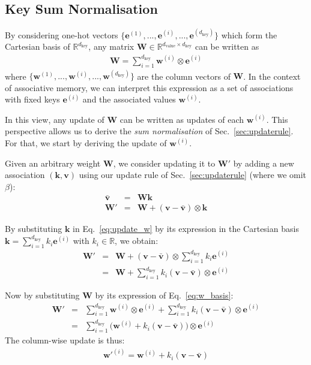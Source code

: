 \documentclass{article}
\def\ve{{\bm{e}}}
\def\vk{{\bm{k}}}
\def\vv{{\bm{v}}}
\def\vw{{\bm{w}}}
\def\mW{{\bm{W}}}
\theoremstyle{definition}
\begin{document}
\subsection{Key Sum Normalisation}
\label{app:norm}

By considering one-hot vectors $\{\ve^{(1)}, ..., \ve^{(i)}, ..., \ve^{(d_\text{key})}\}$
which form the Cartesian basis of $\mathbb{R}^{d_\text{key}}$,
any matrix $\mW \in \mathbb{R}^{d_\text{value} \times d_\text{key}}$ can be written as
\begin{eqnarray}
\mW = \displaystyle \sum_{i=1}^{d_\text{key}} \vw^{(i)}\otimes \ve^{(i)} \label{eq:w_basis}
\end{eqnarray}
where $\{\vw^{(1)}, ..., \vw^{(i)}, ..., \vw^{(d_\text{key})}\}$ are the column vectors of $\mW$.
In the context of associative memory, we can interpret this expression as a set of associations with fixed keys $\ve^{(i)}$ and the associated values $\vw^{(i)}$.

In this view, any update of $\mW$ can be written as updates of each $\vw^{(i)}$.
This perspective allows us to derive the \textit{sum normalisation} of Sec.~\ref{sec:updaterule}.
For that, we start by deriving the update of $\vw^{(i)}$. 

Given an arbitrary weight $\mW$, we consider updating it to $\mW'$ by adding a
new association $(\vk, \vv)$ using our update rule of Sec.~\ref{sec:updaterule} (where we omit
$\beta$):
\begin{eqnarray}
\bar{\vv} &=& \mW \vk \\
\mW' &=& \mW + (\vv - \bar{\vv}) \otimes \vk \label{eq:update_w}
\end{eqnarray}

By substituting $\vk$ in Eq.~\ref{eq:update_w} by its expression in the Cartesian basis $\displaystyle \vk = \sum_{i=1}^{d_\text{key}} k_i \ve^{(i)}$ with $k_i \in \mathbb{R}$, we obtain:
\begin{eqnarray}
\mW' &=& \mW + (\vv - \bar{\vv})  \otimes \sum_{i=1}^{d_\text{key}} k_i \ve^{(i)} \\
&=& \mW + \sum_{i=1}^{d_\text{key}} k_i (\vv - \bar{\vv})  \otimes \ve^{(i)} 
\end{eqnarray}

Now by substituting $\mW$ by its expression of Eq.~\ref{eq:w_basis}:
\begin{eqnarray}
\mW' &=& \sum_{i=1}^{d_\text{key}} \vw^{(i)}\otimes \ve^{(i)}  + \sum_{i=1}^{d_\text{key}} k_i (\vv - \bar{\vv})  \otimes \ve^{(i)}  \\
&=& \sum_{i=1}^{d_\text{key}} \big( \vw^{(i)} +  k_i (\vv - \bar{\vv}) \big) \otimes \ve^{(i)}
\end{eqnarray}
The column-wise update is thus: 
\begin{eqnarray}
\vw'^{(i)} = \vw^{(i)} +  k_i (\vv - \bar{\vv}) \label{eq:col_update1}
\end{eqnarray}
\end{document}
